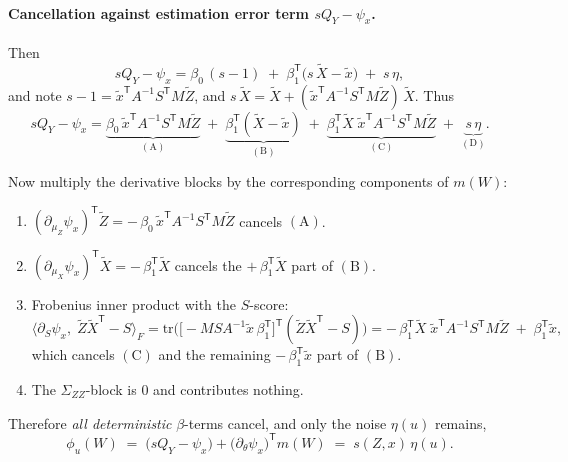 \documentclass[12pt]{article}
\newcommand{\T}{\mathsf{T}} %
\begin{document}
\paragraph{Cancellation against estimation error term $sQ_Y-\psi_x$.}
Then
\[
sQ_Y-\psi_x
= \beta_0\,(s-1) \;+\; \beta_1^{\T}\big(s\,\widetilde X-\tilde x\big)\;+\;s\,\eta,
\]
and note $s-1=\tilde x^{\T}A^{-1}S^{\T}M\widetilde Z$, and $s\,\widetilde X=\widetilde X+(\tilde x^{\T}A^{-1}S^{\T}M\widetilde Z)\,\widetilde X$. Thus
\[
sQ_Y-\psi_x
= \underbrace{\beta_0\,\tilde x^{\T}A^{-1}S^{\T}M\widetilde Z}_{(\mathrm{A})}
\;+\;\underbrace{\beta_1^{\T}(\widetilde X-\tilde x)}_{(\mathrm{B})}
\;+\;\underbrace{\beta_1^{\T}\widetilde X\;\tilde x^{\T}A^{-1}S^{\T}M\widetilde Z}_{(\mathrm{C})}
\;+\;\underbrace{s\,\eta}_{(\mathrm{D})}.
\]

Now multiply the derivative blocks by the corresponding components of $m(W)$:
\begin{enumerate}
\item $(\partial_{\mu_Z}\psi_x)^{\T}\widetilde Z = -\,\beta_0\,\tilde x^{\T}A^{-1}S^{\T}M\widetilde Z$ cancels $(\mathrm{A})$.
\item $(\partial_{\mu_X}\psi_x)^{\T}\widetilde X = -\,\beta_1^{\T}\widetilde X$ cancels the $+\,\beta_1^{\T}\widetilde X$ part of $(\mathrm{B})$.
\item Frobenius inner product with the $S$-score:
\[
\big\langle \partial_{S}\psi_x,\; \widetilde Z\widetilde X^{\T}-S\big\rangle_F
= \mathrm{tr}\!\Big(\big[-M S A^{-1}\tilde x\,\beta_1^{\T}\big]^{\T}(\widetilde Z\widetilde X^{\T}-S)\Big)
= -\,\beta_1^{\T}\widetilde X\;\tilde x^{\T}A^{-1}S^{\T}M\widetilde Z
\;+\;\beta_1^{\T}\tilde x,
\]
which cancels $(\mathrm{C})$ and the remaining $-\,\beta_1^{\T}\tilde x$ part of $(\mathrm{B})$.
\item The $\Sigma_{ZZ}$-block is $0$ and contributes nothing.
\end{enumerate}
Therefore \emph{all deterministic} $\beta$-terms cancel, and only the noise $\eta(u)$ remains,
\[
\phi_u(W)
\;=\; \big(sQ_Y-\psi_x\big) + \big(\partial_\theta\psi_x\big)^{\T} m(W)
\;=\; s(Z,x)\,\eta(u).
\]
\end{document}
